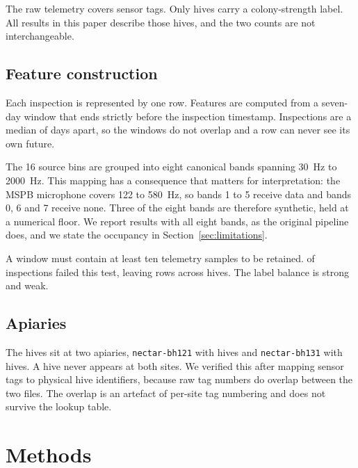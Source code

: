﻿\documentclass[review,12pt]{elsarticle}
\begin{document}
The raw telemetry covers \LeakRawTags{} sensor tags.
Only \LeakNHives{} hives carry a colony-strength label.
All results in this paper describe those \LeakNHives{} hives, and the two counts
are not interchangeable.

\subsection{Feature construction}

Each inspection is represented by one row.
Features are computed from a seven-day window that ends strictly before the
inspection timestamp.
Inspections are a median of \LeakMedianGapDays{} days apart, so the windows do
not overlap and a row can never see its own future.

The 16 source bins are grouped into eight canonical bands spanning
\SI{30}{\hertz} to \SI{2000}{\hertz}.
This mapping has a consequence that matters for interpretation:
the MSPB microphone covers \SI{122}{} to \SI{580}{\hertz}, so bands 1 to 5
receive data and bands 0, 6 and 7 receive none.
Three of the eight bands are therefore synthetic, held at a numerical floor.
We report results with all eight bands, as the original pipeline does, and we
state the occupancy in Section~\ref{sec:limitations}.

A window must contain at least ten telemetry samples to be retained.
\LeakNSkippedInspections{} of \LeakNInspectionsSource{} inspections failed this
test, leaving \LeakNRows{} rows across \LeakNHives{} hives.
The label balance is \LeakNStrong{} strong and \LeakNWeak{} weak.

\subsection{Apiaries}

The hives sit at two apiaries, \texttt{nectar-bh121} with \LeakNApiaryOne{}
hives and \texttt{nectar-bh131} with \LeakNApiaryTwo{} hives.
A hive never appears at both sites.
We verified this after mapping sensor tags to physical hive identifiers,
because raw tag numbers do overlap between the two files.
The overlap is an artefact of per-site tag numbering and does not survive the
lookup table.

\section{Methods}
\end{document}
